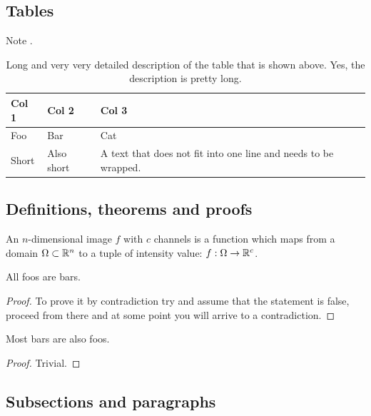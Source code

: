     \subsection{Tables}

      Note .

      \begin{table}[th]
        \centering
        \begin{tabularx}{\columnwidth}{XXX}
        \toprule
        Col 1 & Col 2 & Col 3 \\
        \midrule
        Foo & Bar & Cat \\
        Short & Also short & A text that does not fit into one line and needs to be wrapped. \\
        \bottomrule
        \end{tabularx}
        \caption[Short description of a table.]{Long and very very detailed description of the table that is shown above. Yes, the description is pretty long.}\label{tab:example}
      \end{table}

    \subsection{Definitions, theorems and proofs}

      \begin{definition}[Image]
        An \( n \)-dimensional image \( f \) with \( c \) channels is a function which maps from a domain \(\Omega \subset \mathbb{R}^n \) to a tuple of intensity value: \( f : \Omega \to \mathbb{R}^c \).
      \end{definition}

      \begin{theorem}[Foo]
        All foos are bars.
      \end{theorem}
      \begin{proof}
        To prove it by contradiction try and assume that the statement is false,
        proceed from there and at some point you will arrive to a contradiction.
      \end{proof}

      \begin{lemma}[Bar]
        Most bars are also foos.
      \end{lemma}
      \begin{proof}
        Trivial.
      \end{proof}

    \subsection{Subsections and paragraphs}

